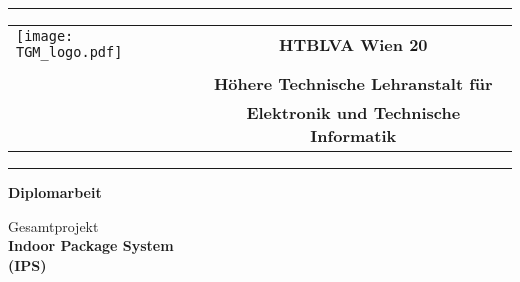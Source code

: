

\begin{titlepage}
\noindent\rule{\textwidth}{1pt}
\begin{tabular}{lc}
\texttt{[image: TGM\_logo.pdf]}& \LARGE \textbf{HTBLVA Wien 20} \\
 \\
 &\textbf{Höhere Technische Lehranstalt für}\\
 & \textbf{Elektronik und Technische Informatik}\\
\end{tabular}

\noindent\rule{\textwidth}{1pt}
\begin{center}

\vspace*{1cm}
\Huge
\textbf{Diplomarbeit}

\vspace{1.7cm}
\normalsize
Gesamtprojekt\\
\LARGE
\textbf{Indoor Package System\\(IPS)}\\
\end{center}

\vspace{1.7cm}

\normalsize
\large


\end{titlepage}
